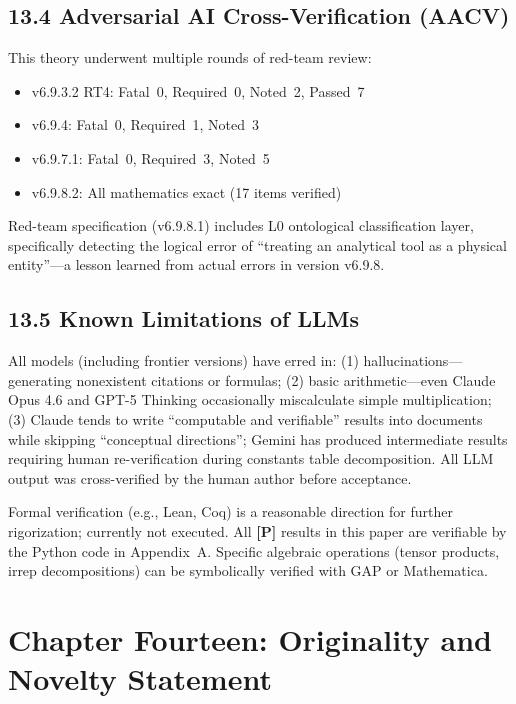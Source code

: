 \documentclass[11pt,a4paper]{article}
\newcommand{\gradeP}{\textbf{[P]}}
\begin{document}
\subsection{13.4 Adversarial AI Cross-Verification (AACV)}

This theory underwent multiple rounds of red-team review:
\begin{itemize}[nosep]
\item v6.9.3.2 RT4: Fatal~0, Required~0, Noted~2, Passed~7
\item v6.9.4: Fatal~0, Required~1, Noted~3
\item v6.9.7.1: Fatal~0, Required~3, Noted~5
\item v6.9.8.2: All mathematics exact (17 items verified)
\end{itemize}
Red-team specification (v6.9.8.1) includes L0 ontological classification layer, specifically detecting the logical error of ``treating an analytical tool as a physical entity''---a lesson learned from actual errors in version v6.9.8.

\subsection{13.5 Known Limitations of LLMs}

All models (including frontier versions) have erred in: (1) hallucinations---generating nonexistent citations or formulas; (2) basic arithmetic---even Claude Opus 4.6 and GPT-5 Thinking occasionally miscalculate simple multiplication; (3) Claude tends to write ``computable and verifiable'' results into documents while skipping ``conceptual directions''; Gemini has produced intermediate results requiring human re-verification during constants table decomposition. All LLM output was cross-verified by the human author before acceptance.

Formal verification (e.g., Lean, Coq) is a reasonable direction for further rigorization; currently not executed. All \gradeP{} results in this paper are verifiable by the Python code in Appendix~A. Specific algebraic operations (tensor products, irrep decompositions) can be symbolically verified with GAP or Mathematica.

\section{Chapter Fourteen: Originality and Novelty Statement}\label{sec:ch14}
\end{document}
